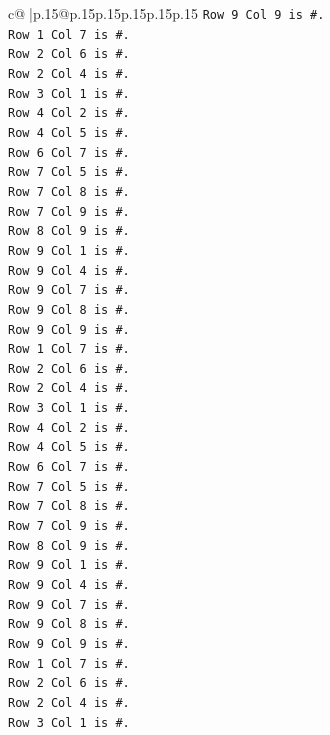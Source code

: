 \documentclass{article}
\begin{document}
{\begin{supertabular}{c@{$\;$}|p{.15\linewidth}@{}p{.15\linewidth}p{.15\linewidth}p{.15\linewidth}p{.15\linewidth}p{.15\linewidth}}
{{{\texttt{Row 9 Col 9 is \#.} \\
\texttt{Row 1 Col 7 is \#.} \\
\texttt{Row 2 Col 6 is \#.} \\
\texttt{Row 2 Col 4 is \#.} \\
\texttt{Row 3 Col 1 is \#.} \\
\texttt{Row 4 Col 2 is \#.} \\
\texttt{Row 4 Col 5 is \#.} \\
\texttt{Row 6 Col 7 is \#.} \\
\texttt{Row 7 Col 5 is \#.} \\
\texttt{Row 7 Col 8 is \#.} \\
\texttt{Row 7 Col 9 is \#.} \\
\texttt{Row 8 Col 9 is \#.} \\
\texttt{Row 9 Col 1 is \#.} \\
\texttt{Row 9 Col 4 is \#.} \\
\texttt{Row 9 Col 7 is \#.} \\
\texttt{Row 9 Col 8 is \#.} \\
\texttt{Row 9 Col 9 is \#.} \\
\texttt{Row 1 Col 7 is \#.} \\
\texttt{Row 2 Col 6 is \#.} \\
\texttt{Row 2 Col 4 is \#.} \\
\texttt{Row 3 Col 1 is \#.} \\
\texttt{Row 4 Col 2 is \#.} \\
\texttt{Row 4 Col 5 is \#.} \\
\texttt{Row 6 Col 7 is \#.} \\
\texttt{Row 7 Col 5 is \#.} \\
\texttt{Row 7 Col 8 is \#.} \\
\texttt{Row 7 Col 9 is \#.} \\
\texttt{Row 8 Col 9 is \#.} \\
\texttt{Row 9 Col 1 is \#.} \\
\texttt{Row 9 Col 4 is \#.} \\
\texttt{Row 9 Col 7 is \#.} \\
\texttt{Row 9 Col 8 is \#.} \\
\texttt{Row 9 Col 9 is \#.} \\
\texttt{Row 1 Col 7 is \#.} \\
\texttt{Row 2 Col 6 is \#.} \\
\texttt{Row 2 Col 4 is \#.} \\
\texttt{Row 3 Col 1 is \#.} \\
}}}
\end{supertabular}}
\end{document}
